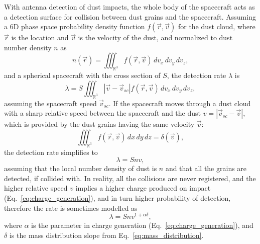With antenna detection of dust impacts, the whole body of the spacecraft acts as a detection surface for collision between dust grains and the spacecraft. Assuming a 6D phase space probability density function $f(\vec{r},\vec{v})$ for the dust cloud, where $\vec{r}$ is the location and $\vec{v}$ is the velocity of the dust, and normalized to dust number density $n$ as
\begin{equation}
    n(\vec{r}) = \iiint_{\mathbb{R}^3} f(\vec{r},\vec{v}) \,dv_x\,dv_y\,dv_z,
\end{equation}
and a spherical spacecraft with the cross section of $S$, the detection rate $\lambda$ is
\begin{equation}
    \lambda = S \iiint_{\mathbb{R}^3} |\vec{v}-\vec{v}_{sc}| f(\vec{r},\vec{v})  \,dv_x\,dv_y\,dv_z, \label{eq:phase_space_lambda}
\end{equation}
assuming the spacecraft speed $\vec{v}_{sc}$. If the spacecraft moves through a dust cloud with a sharp relative speed between the spacecraft and the dust $v=|\vec{v}_{sc}-\vec{v}|$, which is provided by the dust grains having the same velocity $\vec{v}$:
\begin{equation}
    \iiint_{\mathbb{R}^3} f(\vec{r},\vec{v}) \,dx\,dy\,dz = \delta(\vec{v}),
\end{equation}
the detection rate simplifies to  
\begin{equation}
    \lambda = S n v,
\end{equation}
assuming that the local number density of dust is $n$ and that all the grains are detected, if collided with. In reality, all the collisions are never registered, and the higher relative speed $v$ implies a higher charge produced on impact (Eq.~\ref{eq:charge_generation}), and in turn higher probability of detection, therefore the rate is sometimes modelled as
\begin{equation}
    \lambda = S n v^{1+\alpha \delta}, \label{eq:rate_semi_general}
\end{equation}
where $\alpha$ is the parameter in charge generation (Eq.~\ref{eq:charge_generation}), and $\delta$ is the mass distribution slope from Eq.~\ref{eq:mass_distribution}. 

